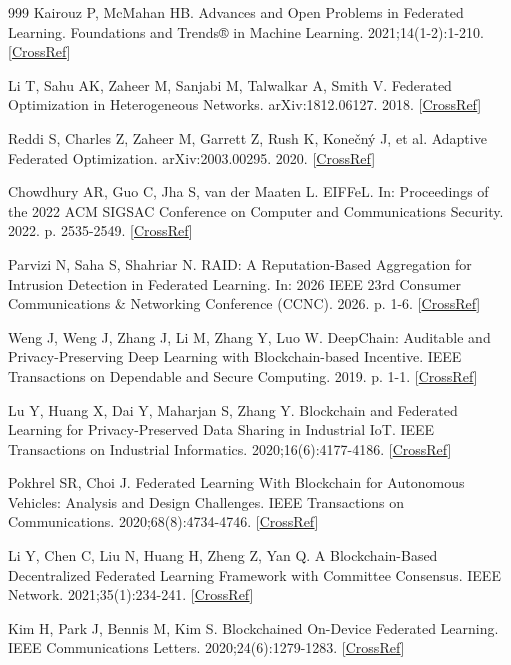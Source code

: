 \documentclass[cmc,article,submit,moreauthors,pdftex]{Definitions/tsp}
\begin{document}
\begin{thebibliography}{999}
Kairouz P, McMahan HB. Advances and Open Problems in Federated Learning. Foundations and Trends® in Machine Learning. 2021;14(1-2):1-210. [\href{https://doi.org/10.1561/2200000083}{CrossRef}]

Li T, Sahu AK, Zaheer M, Sanjabi M, Talwalkar A, Smith V. Federated Optimization in Heterogeneous Networks. arXiv:1812.06127. 2018. [\href{https://doi.org/10.48550/arXiv.1812.06127}{CrossRef}]

Reddi S, Charles Z, Zaheer M, Garrett Z, Rush K, Konečný J, et al. Adaptive Federated Optimization. arXiv:2003.00295. 2020. [\href{https://doi.org/10.48550/arXiv.2003.00295}{CrossRef}]

Chowdhury AR, Guo C, Jha S, van der Maaten L. EIFFeL. In: Proceedings of the 2022 ACM SIGSAC Conference on Computer and Communications Security. 2022. p. 2535-2549. [\href{https://doi.org/10.1145/3548606.3560611}{CrossRef}]

Parvizi N, Saha S, Shahriar N. RAID: A Reputation-Based Aggregation for Intrusion Detection in Federated Learning. In: 2026 IEEE 23rd Consumer Communications \& Networking Conference (CCNC). 2026. p. 1-6. [\href{https://doi.org/10.1109/ccnc65079.2026.11366587}{CrossRef}]

Weng J, Weng J, Zhang J, Li M, Zhang Y, Luo W. DeepChain: Auditable and Privacy-Preserving Deep Learning with Blockchain-based Incentive. IEEE Transactions on Dependable and Secure Computing. 2019. p. 1-1. [\href{https://doi.org/10.1109/tdsc.2019.2952332}{CrossRef}]

Lu Y, Huang X, Dai Y, Maharjan S, Zhang Y. Blockchain and Federated Learning for Privacy-Preserved Data Sharing in Industrial IoT. IEEE Transactions on Industrial Informatics. 2020;16(6):4177-4186. [\href{https://doi.org/10.1109/tii.2019.2942190}{CrossRef}]

Pokhrel SR, Choi J. Federated Learning With Blockchain for Autonomous Vehicles: Analysis and Design Challenges. IEEE Transactions on Communications. 2020;68(8):4734-4746. [\href{https://doi.org/10.1109/tcomm.2020.2990686}{CrossRef}]

Li Y, Chen C, Liu N, Huang H, Zheng Z, Yan Q. A Blockchain-Based Decentralized Federated Learning Framework with Committee Consensus. IEEE Network. 2021;35(1):234-241. [\href{https://doi.org/10.1109/mnet.011.2000263}{CrossRef}]

Kim H, Park J, Bennis M, Kim S. Blockchained On-Device Federated Learning. IEEE Communications Letters. 2020;24(6):1279-1283. [\href{https://doi.org/10.1109/lcomm.2019.2921755}{CrossRef}]


\end{thebibliography}
\end{document}
